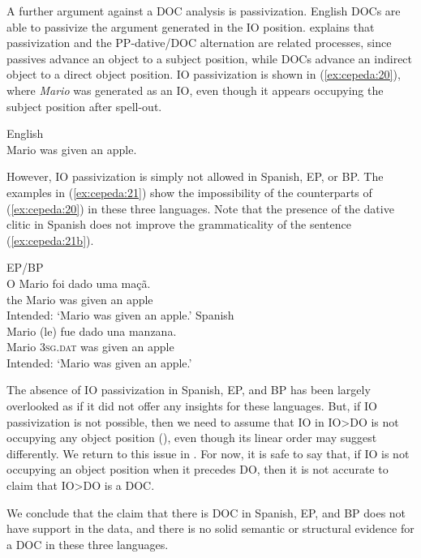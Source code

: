 \documentclass[output=paper,colorlinks,citecolor=brown,modfonts,nonflat]{langsci/langscibook}
\begin{document}
A further argument against a DOC analysis is passivization. English DOCs are able to passivize the argument generated in the IO position. \citet{Larson1988} explains that passivization and the PP-dative/DOC alternation are related processes, since passives advance an object to a subject position, while DOCs advance an indirect object to a direct object position. IO passivization is shown in (\ref{ex:cepeda:20}), where \textit{Mario} was generated as an IO, even though it appears occupying the subject position after spell-out.

\ea%
    \label{ex:cepeda:20}
    English\\
	Mario was given an apple.
\z

However, IO passivization is simply not allowed in Spanish, EP, or BP. The examples in (\ref{ex:cepeda:21}) show the impossibility of the counterparts of (\ref{ex:cepeda:20}) in these three languages. Note that the presence of the dative clitic in Spanish does not improve the grammaticality of the sentence (\ref{ex:cepeda:21b}).

\ea%
    \label{ex:cepeda:21}
	\ea\label{ex:cepeda:21a}
	EP/BP\\
	\gll *O Mario  foi   dado uma maçã.\\
		the Mario was given an    apple\\
	\glt Intended: ‘Mario was given an apple.’
	\newpage
	\ex\label{ex:cepeda:21b}
	Spanish\\
	\gll  *Mario (le) fue dado  una manzana.\\
		Mario \textsc{3sg.dat} was given an apple\\
	\glt Intended: ‘Mario was given an apple.’
	\z
\z

The absence of IO passivization in Spanish, EP, and BP has been largely overlooked as if it did not offer any insights for these languages. But, if IO passivization is not possible, then we need to assume that IO in IO>DO is not occupying any object position (\citealt{Larson2014}), even though its linear order may suggest differently. We return to this issue in . For now, it is safe to say that, if IO is not occupying an object position when it precedes DO, then it is not accurate to claim that IO>DO is a DOC.

We conclude that the claim that there is DOC in Spanish, EP, and BP does not have support in the data, and there is no solid semantic or structural evidence for a DOC in these three languages.
\end{document}
